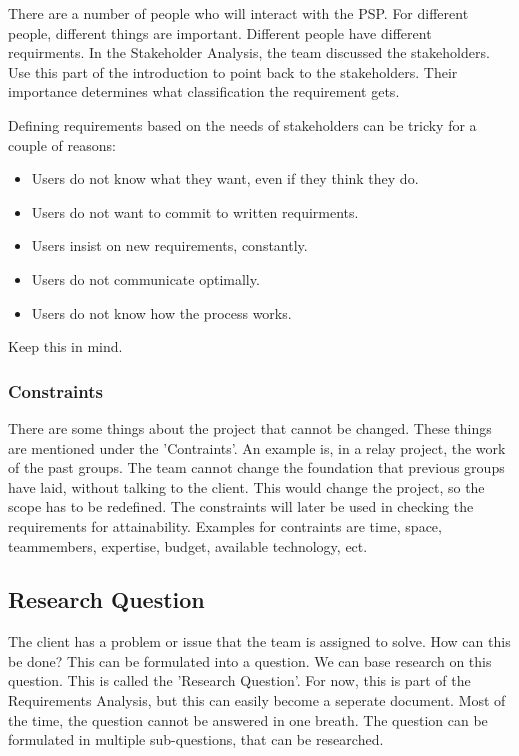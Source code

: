 \documentclass[10pt]{report}
\begin{document}
There are a number of people who will interact with the PSP. For different people, different things are important. Different people have different requirments. In the Stakeholder Analysis, the team discussed the stakeholders. Use this part of the introduction to point back to the stakeholders. Their importance determines what classification the requirement gets.

Defining requirements based on the needs of stakeholders can be tricky for a couple of reasons:

\begin{itemize}
	\item Users do not know what they want, even if they think they do.
	\item Users do not want to commit to written requirments.
	\item Users insist on new requirements, constantly.
	\item Users do not communicate optimally.
	\item Users do not know how the process works.
\end{itemize}

Keep this in mind.

\subsubsection{Constraints}

There are some things about the project that cannot be changed. These things are mentioned under the 'Contraints'. An example is, in a relay project, the work of the past groups. The team cannot change the foundation that previous groups have laid, without talking to the client. This would change the project, so the scope has to be redefined. The constraints will later be used in checking the requirements for attainability. Examples for contraints are time, space, teammembers, expertise, budget, available technology, ect.

\subsection{Research Question}

The client has a problem or issue that the team is assigned to solve. How can this be done? This can be formulated into a question. We can base research on this question. This is called the 'Research Question'. For now, this is part of the Requirements Analysis, but this can easily become a seperate document. Most of the time, the question cannot be answered in one breath. The question can be formulated in multiple sub-questions, that can be researched.
\end{document}
